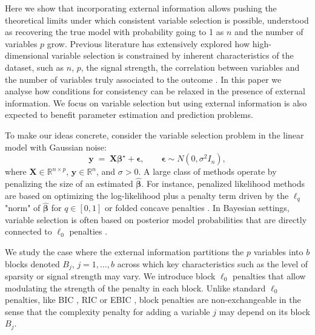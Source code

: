 \documentclass[aos]{imsart}
\theoremstyle{plain}
\newcommand{\R}{\mathbb{R}}
\newcommand{\bs}{\boldsymbol}
\begin{document}
Here we show that incorporating external information allows pushing the theoretical limits under which consistent variable selection is possible, understood as recovering the true model with probability going to 1 as $n$ and the number of variables $p$ grow. Previous literature has extensively explored how high-dimensional variable selection is constrained by inherent characteristics of the dataset, such as $n$, $p$, the signal strength, the correlation between variables and the number of variables truly associated to the outcome \cite{buhlmannvandegeerbook,overviewvarsel,handbookbayesvarsel,wainwrighthighdimbook}. In this paper we analyse how conditions for consistency can be relaxed in the presence of external information. We focus on variable selection but using external information is also expected to benefit parameter estimation and prediction problems. 

To make our ideas concrete, consider the variable selection problem in the linear model with Gaussian noise:
\begin{equation}\label{eq:linearmodel}
	\bs y \;=\; \bs X \bs \beta^{\star} + \bs\epsilon,\qquad \bs \epsilon \sim N(0,\sigma^2 I_n),
\end{equation}
where $\bs X\in \R^{n\times p}$, $\bs y\in \R^n$, and $\sigma >0$. A large class of methods operate by penalizing the size of an estimated $\hat{\bs  \beta}$. For instance, penalized likelihood methods are based on optimizing the log-likelihood plus a penalty term driven by the $\ell_q$ "norm" of $\hat{\bs  \beta}$ for $q\in [0,1]$ or folded concave penalties \citep{lasso,overviewvarsel,bertsimas}. 
In Bayesian settings, variable selection is often based on posterior model probabilities that are directly connected to $\ell_0$ penalties \citep{BIC,EBIC,rossell2022concentration}. 

We study the case where the external information partitions the $p$ variables into $b$ blocks denoted $B_j$, $j=1,\ldots,b$ across which key characteristics such as the level of sparsity or signal strength may vary. We introduce block $\ell_0$ penalties that allow modulating the strength of the penalty in each block. Unlike standard $\ell_0$ penalties, like BIC \cite{BIC}, RIC \cite{RIC} or EBIC \cite{EBIC}, block penalties are non-exchangeable in the sense that the complexity penalty for adding a variable $j$ may depend on its block $B_j$.
\end{document}
